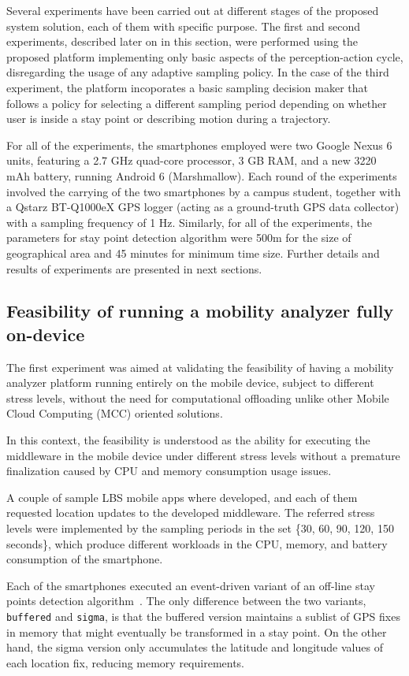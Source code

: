 \documentclass[ENG,PhD]{cinvestav}
\begin{document}
Several experiments have been carried out at different stages of the proposed system solution, each of them with specific purpose.
The first and second experiments, described later on in this section, were performed using the proposed platform implementing only basic aspects of the perception-action cycle, disregarding the usage of any adaptive sampling policy.
In the case of the third experiment, the platform incoporates a basic sampling decision maker that follows a policy for selecting a different sampling period depending on whether user is inside a stay point or describing motion during a trajectory.

For all of the experiments, the smartphones employed were two Google Nexus 6 units, featuring a 2.7 GHz quad-core processor, 3 GB RAM, and a new 3220 mAh battery, running Android 6 (Marshmallow).
Each round of the experiments involved the carrying of the two smartphones by a campus student, together with a Qstarz BT-Q1000eX GPS logger (acting as a ground-truth GPS data collector) with a sampling frequency of 1 Hz.
Similarly, for all of the experiments, the parameters for stay point detection algorithm were 500m for the size of geographical area and 45 minutes for minimum time size.
Further details and results of experiments are presented in next sections.


\subsection{Feasibility of running a mobility analyzer fully on-device}
The first experiment was aimed at validating the feasibility of having a mobility analyzer platform running entirely on the mobile device, subject to different stress levels, without the need for computational offloading unlike other Mobile Cloud Computing (MCC) oriented solutions\cite{Perez-Torres2016b}.

In this context, the feasibility is understood as the ability for executing the middleware in the mobile device under different stress levels without a premature finalization caused by CPU and memory consumption usage issues.

A couple of sample LBS mobile apps where developed, and each of them requested location updates to the developed middleware.
The referred stress levels were implemented by the sampling periods in the set \{30, 60, 90, 120, 150 seconds\}, which produce different workloads in the CPU, memory, and battery consumption of the smartphone.

Each of the smartphones executed an event-driven variant of an off-line stay points detection algorithm~\cite{Li2008,Ye2009,Perez-Torres2016b}.
The only difference between the two variants, \texttt{buffered} and \texttt{sigma}, is that the buffered version maintains a sublist of GPS fixes in memory that might eventually be transformed in a stay point.
On the other hand, the sigma version only accumulates the latitude and longitude values of each location fix, reducing memory requirements.
\end{document}
